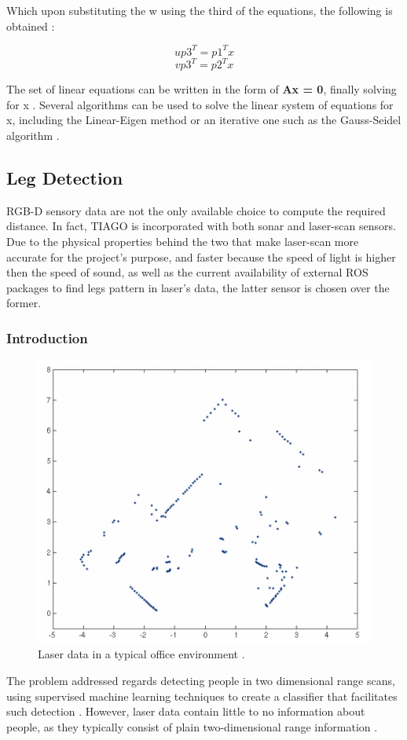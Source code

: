 Which upon substituting the w using the third of the equations, the following is obtained \cite{hartley1997triangulation}:

\[up3^T = p1^Tx\]
\[vp3^T = p2^Tx\]

The set of linear equations can be written in the form of \textbf{Ax = 0}, finally solving for x \cite{hartley1997triangulation}. Several algorithms can be used to solve the linear system of equations for x, including the Linear-Eigen method or an iterative one such as the Gauss-Seidel algorithm \cite{hartley1997triangulation}.

\subsection{Leg Detection}

RGB-D sensory data are not the only available choice to compute the required distance. In fact, TIAGO is incorporated with both sonar and laser-scan sensors. Due to the physical properties behind the two that make laser-scan more accurate for the project's purpose, and faster because the speed of light is higher then the speed of sound, as well as the current availability of external ROS packages to find legs pattern in laser's data, the latter sensor is chosen over the former.

\subsubsection{Introduction}

\begin{figure}[H]
\begin{center}
\includegraphics[width=.4\linewidth]{images/laser-data.png}
\end{center}
\caption{Laser data in a typical office environment \cite{arras2007using}.}
\label{figːlaser_data}
\end{figure}

The problem addressed regards detecting people in two dimensional range scans, using supervised machine learning techniques to create a classifier that facilitates such detection \cite{arras2007using}. However, laser data contain little to no information about people, as they typically consist of plain two-dimensional range information \cite{arras2007using}.

